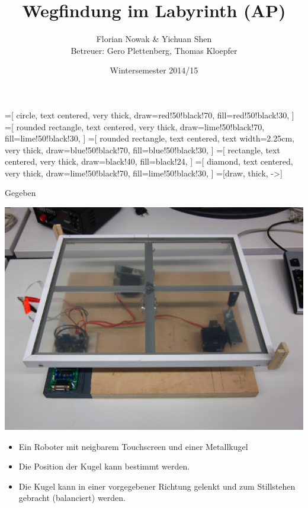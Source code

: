 \documentclass{beamer}
\title{Wegfindung im Labyrinth (AP)}
\author{\texorpdfstring{Florian Nowak \& Yichuan Shen\\ Betreuer: Gero Plettenberg, Thomas Kloepfer}{Florian Nowak \& Yichuan Shen}}
\date{Wintersemester 2014/15}
\begin{document}
\maketitle

=[
  circle,
  text centered,
  very thick,
  draw=red!50!black!70,
  fill=red!50!black!30,
  ]
=[
  rounded rectangle,
  text centered,
  very thick,
  draw=lime!50!black!70,
  fill=lime!50!black!30,
  ]
=[
  rounded rectangle,
  text centered,
  text width=2.25cm,
  very thick,
  draw=blue!50!black!70,
  fill=blue!50!black!30,
  ]
=[
  rectangle,
  text centered,
  very thick,
  draw=black!40,
  fill=black!24,
  ]
=[
  diamond,
  text centered,
  very thick,
  draw=lime!50!black!70,
  fill=lime!50!black!30,
  ]
=[draw, thick, ->]

\begin{frame}[fragile,t]{Gegeben}
\begin{center}
\includegraphics[scale=.13]{roboter_no-maze}
\end{center}
\begin{itemize}
\item Ein Roboter mit neigbarem Touchscreen und einer Metallkugel
\item Die Position der Kugel kann bestimmt werden.
\item Die Kugel kann in einer vorgegebener Richtung gelenkt und zum Stillstehen gebracht (balanciert) werden.
\end{itemize}
\end{frame}
\end{document}
